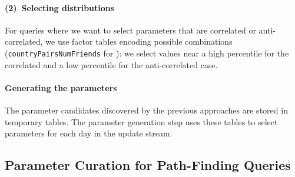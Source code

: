 \paragraph{(2)~Selecting distributions}
%
For queries where we want to select parameters that are correlated or anti-correlated, we use factor tables encoding possible combinations (\eg \texttt{countryPairsNumFriends} for \CR[3]):
we select values near a high percentile for the correlated and a low percentile for the anti-correlated case.

\paragraph{Generating the parameters}
%
The parameter candidates discovered by the previous approaches are stored in temporary tables.
The parameter generation step uses these tables to select parameters for each day in the update stream.




\subsection{Parameter Curation for Path-Finding Queries}
\label{sec:path-curation}

